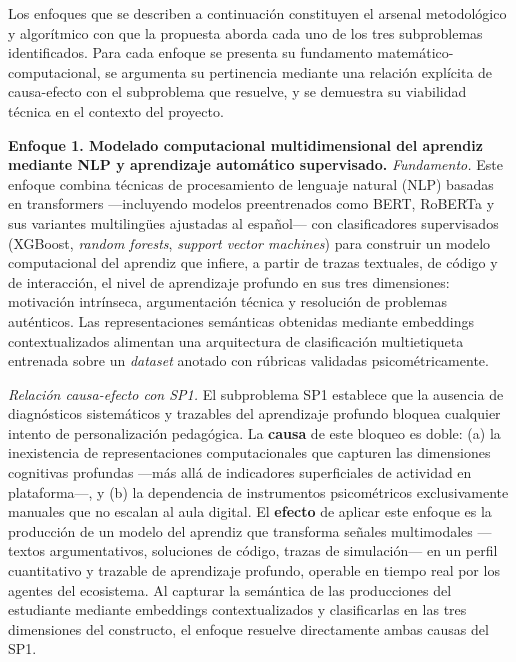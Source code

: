 
Los enfoques que se describen a continuación constituyen el arsenal metodológico y
algorítmico con que la propuesta aborda cada uno de los tres subproblemas
identificados. Para cada enfoque se presenta su fundamento matemático-computacional,
se argumenta su pertinencia mediante una relación explícita de causa-efecto con el
subproblema que resuelve, y se demuestra su viabilidad técnica en el contexto del
proyecto.

\medskip

\noindent\textbf{Enfoque 1. Modelado computacional multidimensional del aprendiz
mediante NLP y aprendizaje automático supervisado.}
\emph{Fundamento.}
Este enfoque combina técnicas de procesamiento de lenguaje natural (NLP) basadas en
transformers —incluyendo modelos preentrenados como BERT, RoBERTa y sus variantes
multilingües ajustadas al español— con clasificadores supervisados (XGBoost,
\emph{random forests}, \emph{support vector machines}) para construir un modelo
computacional del aprendiz que infiere, a partir de trazas textuales, de código y de
interacción, el nivel de aprendizaje profundo en sus tres dimensiones: motivación
intrínseca, argumentación técnica y resolución de problemas auténticos. Las
representaciones semánticas obtenidas mediante embeddings contextualizados alimentan
una arquitectura de clasificación multietiqueta entrenada sobre un \emph{dataset}
anotado con rúbricas validadas psicométricamente.

\emph{Relación causa-efecto con SP1.}
El subproblema SP1 establece que la ausencia de diagnósticos sistemáticos y
trazables del aprendizaje profundo bloquea cualquier intento de personalización
pedagógica. La \textbf{causa} de este bloqueo es doble: (a) la inexistencia de
representaciones computacionales que capturen las dimensiones cognitivas profundas
—más allá de indicadores superficiales de actividad en plataforma—, y (b) la
dependencia de instrumentos psicométricos exclusivamente manuales que no escalan al
aula digital. El \textbf{efecto} de aplicar este enfoque es la producción de un
modelo del aprendiz que transforma señales multimodales —textos argumentativos,
soluciones de código, trazas de simulación— en un perfil cuantitativo y trazable de
aprendizaje profundo, operable en tiempo real por los agentes del ecosistema. Al
capturar la semántica de las producciones del estudiante mediante embeddings
contextualizados y clasificarlas en las tres dimensiones del constructo, el enfoque
resuelve directamente ambas causas del SP1.

